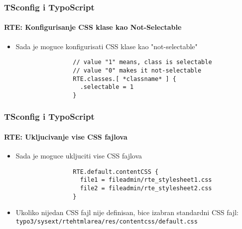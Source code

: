 
\begin{frame}[fragile]
	\frametitle{TSconfig i TypoScript}
	\framesubtitle{RTE: Konfigurisanje CSS klase kao Not-Selectable}

	\begin{itemize}
		\item Sada je moguce konfigurisati CSS klase kao "not-selectable"

			\begin{lstlisting}
				// value "1" means, class is selectable
				// value "0" makes it not-selectable
				RTE.classes.[ *classname* ] {
				  .selectable = 1
				}
			\end{lstlisting}

	\end{itemize}

\end{frame}


\begin{frame}[fragile]
	\frametitle{TSconfig i TypoScript}
	\framesubtitle{RTE: Ukljucivanje vise CSS fajlova}

	\begin{itemize}
		\item Sada je moguce ukljuciti vise CSS fajlova

			\begin{lstlisting}
				RTE.default.contentCSS {
				  file1 = fileadmin/rte_stylesheet1.css
				  file2 = fileadmin/rte_stylesheet2.css
				}
			\end{lstlisting}

		\item Ukoliko nijedan CSS fajl nije definisan, bice izabran standardni CSS fajl:\newline
			\texttt{typo3/sysext/rtehtmlarea/res/contentcss/default.css}

	\end{itemize}

\end{frame}

